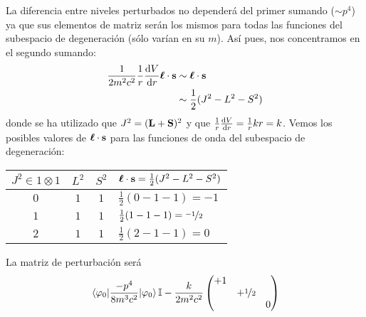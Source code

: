 La diferencia entre niveles perturbados no dependerá del primer
sumando ($\sim p^4$) ya que sus elementos de matriz serán los mismos
para todas las funciones del subespacio de degeneración (sólo varían
en su $m$). Así pues, nos concentramos en el segundo sumando:
\begin{equation}
  \begin{split}
    \frac{1}{2m^2c^2} \frac{1}{r} \dv{V}{r}
    \bm{\mathrm{\ell}} \cdot \bm{\mathrm{s}} &\sim \bm{\mathrm{\ell}} \cdot
    \bm{\mathrm{s}} \\
    &\sim \frac{1}{2}(J^2 - L^2 -S^2)
  \end{split}
\end{equation}
donde se ha utilizado que $J^2 = (\bm{\mathrm{L}}+\bm{\mathrm{S}})^2$ y que
$\frac{1}{r}\dv{V}{r} = \frac{1}{r} kr=k$. Vemos los posibles valores
de $\bm{\mathrm{\ell}}\cdot \bm{\mathrm{s}}$ para las funciones de onda del
subespacio de degeneración:
\begin{center}
  \begin{tabular}{ccc|l}
    $J^2 \in 1\otimes 1$ & $L^2$ & $S^2$ & $\bm{\mathrm{\ell}}\cdot
                                           \bm{\mathrm{s}} = \frac{1}{2}(J^2-L^2-S^2)$
    \\ \hline
    $0$ & $1$ & $1$ & $\frac{1}{2}(0-1-1)=-1$ \\
    $1$ & $1$ & $1$ & $\frac{1}{2}(1-1-1)={\nicefrac{-1}{2}}$ \\
    $2$ & $1$ & $1$ & $\frac{1}{2}(2-1-1)=0$ \\
  \end{tabular}
\end{center}

La matriz de perturbación será
\begin{equation}
  \ev{\frac{-p^4}{8m^3c^2}}{\varphi_0} \mathbb{I}  - \frac{k}{2m^2c^2}
  \begin{pmatrix}
    +1 & & \\
       &+\oh& \\
       & & 0
  \end{pmatrix}
\end{equation}

